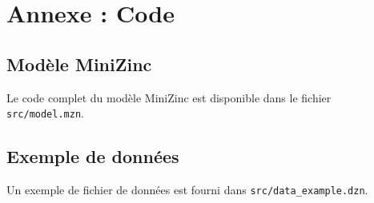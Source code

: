 \section{Annexe : Code}

\subsection{Modèle MiniZinc}

Le code complet du modèle MiniZinc est disponible dans le fichier \texttt{src/model.mzn}.

% 

\subsection{Exemple de données}

Un exemple de fichier de données est fourni dans \texttt{src/data\_example.dzn}.


